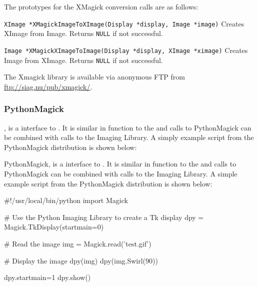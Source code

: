 \documentclass[twoside,11pt]{starlink}
\begin{document}
The prototypes for the XMagick conversion calls are as follows:

\begin{description}
\item \texttt{XImage *XMagickImageToXImage(Display *display, Image *image)}\linebreak
Creates XImage from Image. Returns \texttt{NULL} if not successful.
\item\texttt{Image *XMagickXImageToImage(Display *display, XImage *ximage)}\linebreak
Creates Image from XImage. Returns \texttt{NULL} if not successful.
\end{description}

The Xmagick library is available via anonymous FTP from
\url{ftp://siag.nu/pub/xmagick/}.

\subsubsection{PythonMagick}

,
is a interface to . It is similar in
function to the  and
calls to PythonMagick can be combined with calls to the Imaging
Library. A simply example script from the PythonMagick distribution is
shown below:

PythonMagick, is a interface to . It
is similar in function to the  and calls to PythonMagick can be combined
with calls to the Imaging Library. A simple example script from the
PythonMagick distribution is shown below:


\begin{small}
\begin{terminalv}
#!/usr/local/bin/python
import Magick

# Use the Python Imaging Library to create a Tk display
dpy = Magick.TkDisplay(startmain=0)

# Read the image
img = Magick.read('test.gif')

# Display the image
dpy(img)
dpy(img.Swirl(90))

dpy.startmain=1
dpy.show()
\end{terminalv}
\end{small}

\end{document}
